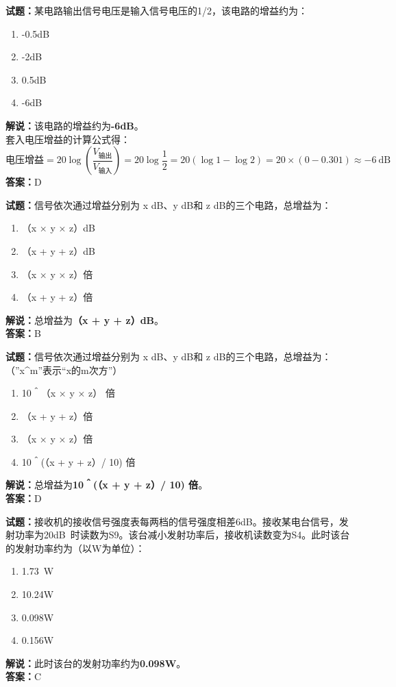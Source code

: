 \documentclass{ctexbook}
\begin{document}
\vspace{1em}

\textbf{试题：}某电路输出信号电压是输入信号电压的1/2，该电路的增益约为：
\begin{enumerate}[leftmargin=3em]
  \item -0.5dB
  \item -2dB
  \item 0.5dB
  \item -6dB
\end{enumerate}
\noindent\textbf{解说：}该电路的增益约为\textbf{-6dB}。\\
套入电压增益的计算公式得：
$$\mbox{电压增益}=20 \log \left( {\frac{V_{ \mbox{输出} }}{V_{ \mbox{输入} }}} \right)=20 \log \frac{1}{2}=20 \left( \log 1 - \log 2 \right) = 20 \times \left( 0 - 0.301 \right) \approx -6 \ \mathrm{dB}$$
\noindent\textbf{答案：}D

\vspace{1em}

\textbf{试题：}信号依次通过增益分别为 x dB、y dB和 z dB的三个电路，总增益为：
\begin{enumerate}[leftmargin=3em]
  \item （x × y × z）dB
  \item （x + y + z）dB
  \item （x × y × z）倍
  \item （x + y + z）倍
\end{enumerate}
\noindent\textbf{解说：}总增益为\textbf{（x + y + z）dB}。\\\noindent\textbf{答案：}B

\vspace{1em}

\textbf{试题：}信号依次通过增益分别为 x dB、y dB和 z dB的三个电路，总增益为：（”x\string^m”表示“x的m次方”）
\begin{enumerate}[leftmargin=3em]
  \item 10＾（x × y × z） 倍
  \item （x + y + z）倍
  \item （x × y × z）倍
  \item 10＾(（x + y + z）/ 10) 倍%
\end{enumerate}
\noindent\textbf{解说：}总增益为\textbf{10＾(（x + y + z）/ 10) 倍}。\\\noindent\textbf{答案：}D

\vspace{1em}

\textbf{试题：}接收机的接收信号强度表每两档的信号强度相差6dB。接收某电台信号，发射功率为20\unit[qualifier-mode=combine]{\deci\bel{}}时读数为S9。该台减小发射功率后，接收机读数变为S4。此时该台的发射功率约为（以W为单位）：
\begin{enumerate}[leftmargin=3em]
  \item \SI{1.73}{\W}
  \item 10.24W
  \item 0.098W
  \item 0.156W
\end{enumerate}
\noindent\textbf{解说：}此时该台的发射功率约为\textbf{0.098W}。\\\noindent\textbf{答案：}C
\end{document}
